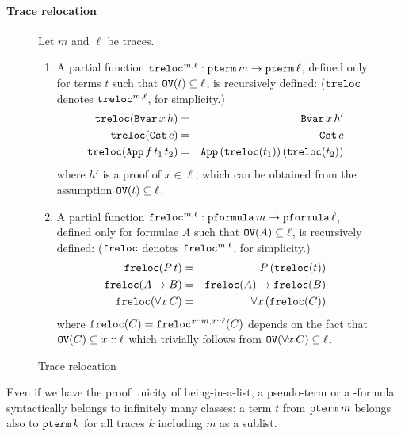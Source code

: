 \documentclass{svjour3}                     %
\newcommand{\tm}{\subseteq}
\newcommand{\tApp}{\textup{\tt App}}
\newcommand{\tBvar}{\textup{\tt Bvar}}
\newcommand{\tCst}{\textup{\tt Cst}}
\newcommand{\tFvar}{\textup{\tt Fvar}}
\newcommand{\tpterm}{\textup{\tt pterm}}
\newcommand{\tpfml}{\textup{\tt pformula}}
\newcommand{\tPH}{\textup{\tt OV}}
\newcommand{\ttlift}{\textup{\tt treloc}}
\newcommand{\tflift}{\textup{\tt freloc}}
\begin{document}
\paragraph{\bf Trace relocation}

\begin{figure}[t]
  Let $m$ and $\ell$ be traces.
\begin{enumerate}
  \item A partial function $\ttlift^{m, \ell} : \tpterm\, m \to \tpterm \, \ell$, defined only for terms $t$ such that $\tPH(t) \subseteq \ell$, is recursively defined: ($\ttlift$ denotes $\ttlift^{m,\ell}$, for simplicity.)
 \begin{eqnarray}
    \ttlift(\tBvar\, x\, h) & = & \tBvar\, x\, h' \label{lift-side}\\
    \ttlift(\tCst\, c) & = & \tCst\, c \nonumber \\
    \ttlift (\tApp\, f\, t_1\, t_2) & = & \tApp\, (\ttlift (t_1))\, (\ttlift(t_2)) \nonumber
  \end{eqnarray}
where  $h'$ is a proof of $x \in \ell$, which can be obtained from the assumption $\tPH(t) \tm \ell$.\medskip

\item A partial function $\tflift^{m, \ell} : \tpfml\, m \to \tpfml \, \ell$, defined only for formulae $A$ such that $\tPH(A) \subseteq \ell$, is recursively defined: ($\tflift$ denotes $\tflift^{m,\ell}$, for simplicity.)
\begin{eqnarray*}
  \tflift(P\, t) & = &  P\, (\ttlift(t)) \\
  \tflift( A \to B) & = & \tflift(A) \to \tflift(B)\\
  \tflift(\forall x\, C) & = & \forall x\, (\tflift(C))
\end{eqnarray*}
where $\tflift(C) = \tflift^{x::m, x::\ell} (C)$ depends on the fact that $\tPH(C) \subseteq x:: \ell$ which trivially follows from $\tPH(\forall x\, C) \tm \ell$.
\end{enumerate}

\hrulefill
  \caption{Trace relocation}
  \label{fig:relocation}
\end{figure}

Even if we have the proof unicity of being-in-a-list, a pseudo-term or a -formula syntactically belongs to infinitely many classes: a term $t$ from $\tpterm \, m$ belongs also to $\tpterm\, k$ for all traces $k$ including $m$ as a sublist. 
\end{document}
